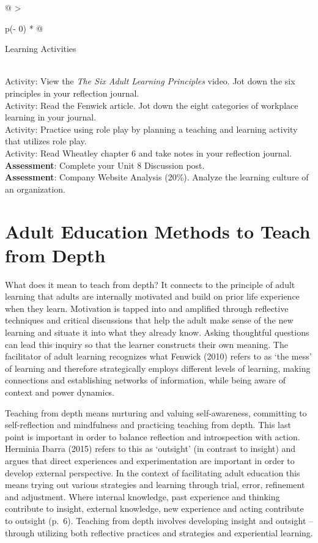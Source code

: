 \documentclass[
]{book}
\begin{document}
\begin{longtable}[]{@{}
  >{\raggedright\arraybackslash}p{(\columnwidth - 0\tabcolsep) * }@{}}
\toprule
\begin{minipage}[b]{\linewidth}\raggedright
Learning Activities
\end{minipage} \\
\midrule
\endhead
Activity: View the \emph{The Six Adult Learning Principles} video. Jot down the six principles in your reflection journal. \\
Activity: Read the Fenwick article. Jot down the eight categories of workplace learning in your journal. \\
Activity: Practice using role play by planning a teaching and learning activity that utilizes role play. \\
Activity: Read Wheatley chapter 6 and take notes in your reflection journal. \\
\textbf{Assessment}: Complete your Unit 8 Discussion post. \\
\textbf{Assessment}: Company Website Analysis (20\%). Analyze the learning culture of an organization. \\
\bottomrule
\end{longtable}

\hypertarget{adult-education-methods-to-teach-from-depth}{%
\section{Adult Education Methods to Teach from Depth}\label{adult-education-methods-to-teach-from-depth}}

What does it mean to teach from depth? It connects to the principle of
adult learning that adults are internally motivated and build on prior
life experience when they learn. Motivation is tapped into and amplified
through reflective techniques and critical discussions that help the
adult make sense of the new learning and situate it into what they
already know. Asking thoughtful questions can lead this inquiry so that
the learner constructs their own meaning. The facilitator of adult
learning recognizes what Fenwick (2010) refers to as `the mess' of
learning and therefore strategically employs different levels of
learning, making connections and establishing networks of information,
while being aware of context and power dynamics.

Teaching from depth means nurturing and valuing self-awareness,
committing to self-reflection and mindfulness and practicing teaching
from depth. This last point is important in order to balance reflection
and introspection with action. Herminia Ibarra (2015) refers to this as
`outsight' (in contrast to insight) and argues that direct experiences
and experimentation are important in order to develop external
perspective. In the context of facilitating adult education this means
trying out various strategies and learning through trial, error,
refinement and adjustment. Where internal knowledge, past experience and
thinking contribute to insight, external knowledge, new experience and
acting contribute to outsight (p.~6). Teaching from depth involves
developing insight and outsight -- through utilizing both reflective
practices and strategies and experiential learning.
\end{document}
